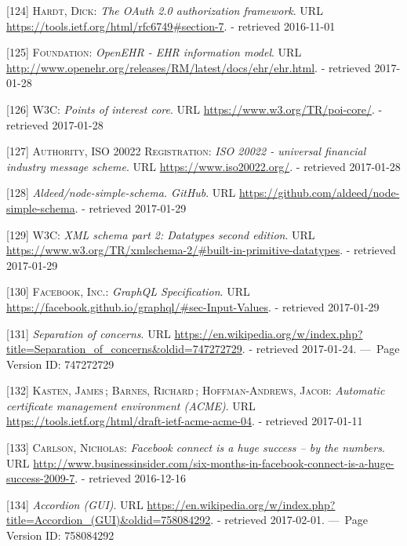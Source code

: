 \documentclass[12pt,english,a4paper,titlepage,cleardoublepage=empty,dottedtoc]{report}
\begin{document}
\hypertarget{ref-web_spec_oauth-2_access-verification}{}
{[}124{]} \textsc{Hardt, Dick}: \emph{The OAuth 2.0 authorization
framework}. URL \url{https://tools.ietf.org/html/rfc6749\#section-7}. -
retrieved 2016-11-01

\hypertarget{ref-web_spec_data-schemas_ehr}{}
{[}125{]} \textsc{Foundation}: \emph{OpenEHR - EHR information model}.
URL \url{http://www.openehr.org/releases/RM/latest/docs/ehr/ehr.html}. -
retrieved 2017-01-28

\hypertarget{ref-web_spec_data-schemas_poi}{}
{[}126{]} \textsc{W3C}: \emph{Points of interest core}. URL
\url{https://www.w3.org/TR/poi-core/}. - retrieved 2017-01-28

\hypertarget{ref-web_spec_data-schemas_bank-transfer}{}
{[}127{]} \textsc{Authority, ISO 20022 Registration}: \emph{ISO 20022 -
universal financial industry message scheme}. URL
\url{https://www.iso20022.org/}. - retrieved 2017-01-28

\hypertarget{ref-web_2017_repo_node-simple-schema}{}
{[}128{]} \emph{Aldeed/node-simple-schema. GitHub}. URL
\url{https://github.com/aldeed/node-simple-schema}. - retrieved
2017-01-29

\hypertarget{ref-web_spec_xml_types}{}
{[}129{]} \textsc{W3C}: \emph{XML schema part 2: Datatypes second
edition}. URL
\url{https://www.w3.org/TR/xmlschema-2/\#built-in-primitive-datatypes}.
- retrieved 2017-01-29

\hypertarget{ref-web_spec_graphql_types}{}
{[}130{]} \textsc{Facebook, Inc.}: \emph{GraphQL Specification}. URL
\url{https://facebook.github.io/graphql/\#sec-Input-Values}. - retrieved
2017-01-29

\hypertarget{ref-web_2016_wikipedia_separation-of-concerns}{}
{[}131{]} \emph{Separation of concerns}. URL
\url{https://en.wikipedia.org/w/index.php?title=Separation_of_concerns\&oldid=747272729}.
- retrieved 2017-01-24. ---~Page Version ID: 747272729

\hypertarget{ref-web_spec_acme}{}
{[}132{]} \textsc{Kasten, James}\,; \textsc{Barnes, Richard}\,;
\textsc{Hoffman-Andrews, Jacob}: \emph{Automatic certificate management
environment (ACME)}. URL
\url{https://tools.ietf.org/html/draft-ietf-acme-acme-04}. - retrieved
2017-01-11

\hypertarget{ref-web_2009-success-of-facebook-connect}{}
{[}133{]} \textsc{Carlson, Nicholas}: \emph{Facebook connect is a huge
success -- by the numbers}. URL
\url{http://www.businessinsider.com/six-months-in-facebook-connect-is-a-huge-success-2009-7}.
- retrieved 2016-12-16

\hypertarget{ref-web_2016_wikipedia_accordion-gui}{}
{[}134{]} \emph{Accordion (GUI)}. URL
\url{https://en.wikipedia.org/w/index.php?title=Accordion_(GUI)\&oldid=758084292}.
- retrieved 2017-02-01. ---~Page Version ID: 758084292
\end{document}
